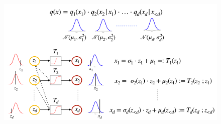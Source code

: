 \begin{figure}[t]
	\centering
	\includegraphics[scale=0.30]{./images/generative/flows/nmf.png}
\end{figure}
